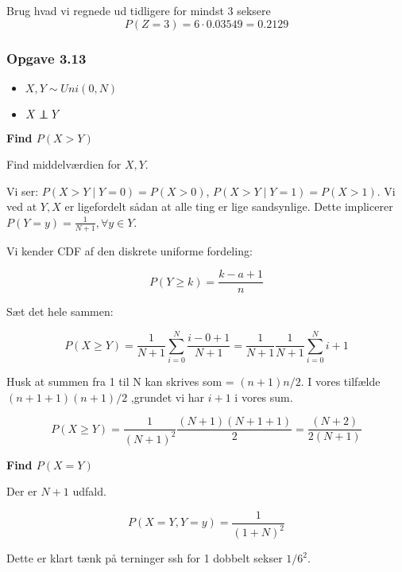 Brug hvad vi regnede ud tidligere for mindst 3 seksere
\begin{equation}
    P(Z=3) = 6 \cdot 0.03549 = 0.2129
\end{equation}

\subsubsection{Opgave 3.13}

\begin{itemize}
    \item $X, Y  \sim Uni(0, N)$
    \item $X \independent Y$
\end{itemize}

\textbf{Find $P(X>Y)$}

Find middelværdien for $X, Y$. 

Vi ser: $P(X>Y \mid Y = 0) = P(X>0)$, $P(X>Y \mid Y = 1) = P(X>1)$. Vi ved at $Y, X$ er ligefordelt sådan at alle ting er lige sandsynlige. Dette implicerer $P(Y=y) = \frac{1}{N + 1}, \forall y \in Y$.

Vi kender CDF af den diskrete uniforme fordeling:

\begin{equation}
    P(Y\geq k) = \frac{k- a + 1}{n}
\end{equation}

Sæt det hele sammen:

\begin{equation}
    P(X \geq Y) = \frac{1}{N + 1} \sum_{i=0}^N \frac{i - 0 + 1}{N + 1} = \frac{1}{N + 1} \frac{1}{N + 1}\sum_{i=0}^N i + 1
\end{equation}

Husk at summen fra 1 til N kan skrives som = $(n+1)n / 2$. I vores tilfælde $(n + 1 + 1)(n+1)/2$ ,grundet vi har $i+1$ i vores sum.

\begin{equation}
    P(X\geq Y) = \frac{1}{(N + 1)^2 } \frac{(N+1)(N+1+1)}{2} = \frac{(N+2)}{2(N+1) }
\end{equation}

\textbf{Find $P(X=Y)$}

Der er $N+1$ udfald.

\begin{equation}
    P(X = Y, Y=y) = \frac{1}{(1 + N)^2}
\end{equation}

Dette er klart tænk på terninger ssh for 1 dobbelt sekser $1/6^2$.

